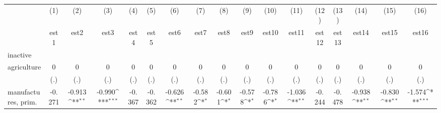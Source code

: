 {
\def\sym#1{\ifmmode^{#1}\else\(^{#1}\)\fi}
\begin{tabular}{l*{16}{c}}
\hline\hline
                    &\multicolumn{1}{c}{(1)}&\multicolumn{1}{c}{(2)}&\multicolumn{1}{c}{(3)}&\multicolumn{1}{c}{(4)}&\multicolumn{1}{c}{(5)}&\multicolumn{1}{c}{(6)}&\multicolumn{1}{c}{(7)}&\multicolumn{1}{c}{(8)}&\multicolumn{1}{c}{(9)}&\multicolumn{1}{c}{(10)}&\multicolumn{1}{c}{(11)}&\multicolumn{1}{c}{(12)}&\multicolumn{1}{c}{(13)}&\multicolumn{1}{c}{(14)}&\multicolumn{1}{c}{(15)}&\multicolumn{1}{c}{(16)}\\
                    &\multicolumn{1}{c}{est1}&\multicolumn{1}{c}{est2}&\multicolumn{1}{c}{est3}&\multicolumn{1}{c}{est4}&\multicolumn{1}{c}{est5}&\multicolumn{1}{c}{est6}&\multicolumn{1}{c}{est7}&\multicolumn{1}{c}{est8}&\multicolumn{1}{c}{est9}&\multicolumn{1}{c}{est10}&\multicolumn{1}{c}{est11}&\multicolumn{1}{c}{est12}&\multicolumn{1}{c}{est13}&\multicolumn{1}{c}{est14}&\multicolumn{1}{c}{est15}&\multicolumn{1}{c}{est16}\\
\hline
inactive            &                     &                     &                     &                     &                     &                     &                     &                     &                     &                     &                     &                     &                     &                     &                     &                     \\
agriculture         &           0         &           0         &           0         &           0         &           0         &           0         &           0         &           0         &           0         &           0         &           0         &           0         &           0         &           0         &           0         &           0         \\
                    &         (.)         &         (.)         &         (.)         &         (.)         &         (.)         &         (.)         &         (.)         &         (.)         &         (.)         &         (.)         &         (.)         &         (.)         &         (.)         &         (.)         &         (.)         &         (.)         \\
[1em]
manufactures, prim. &      -0.271         &      -0.913\sym{**} &      -0.990\sym{***}&      -0.367         &      -0.362         &      -0.626\sym{**} &      -0.582\sym{*}  &      -0.601\sym{*}  &      -0.578\sym{*}  &      -0.786\sym{*}  &      -1.036\sym{**} &      -0.244         &      -0.478         &      -0.938\sym{**} &      -0.830\sym{**} &      -1.574\sym{***}\\

\end{tabular}}
